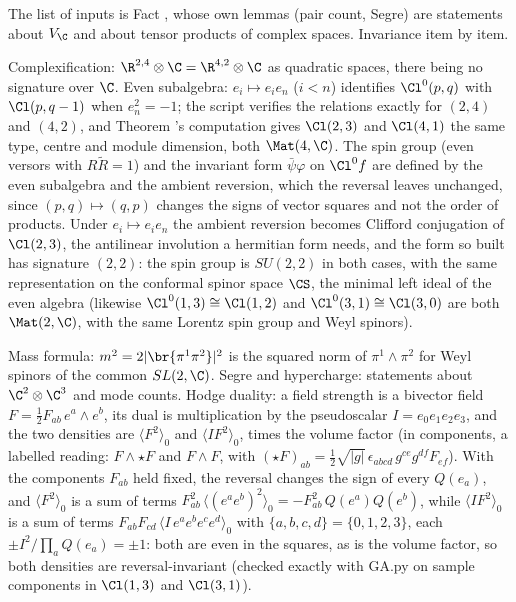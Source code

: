 The list of inputs is Fact , whose own lemmas (pair count, Segre) are statements about $V_{\C}$ and about tensor products of complex spaces. Invariance item by item.

Complexification: $\R^{2,4} \otimes \C = \R^{4,2} \otimes \C$ as quadratic spaces, there being no signature over $\C$. Even subalgebra: $e_{i} \mapsto e_{i}e_{n}$ ($i < n$) identifies $\Cl^{0}(p,q)$ with $\Cl(p, q-1)$ when $e_{n}^{2} = -1$; the script verifies the relations exactly for $(2,4)$ and $(4,2)$, and Theorem 's computation gives $\Cl(2,3)$ and $\Cl(4,1)$ the same type, centre and module dimension, both $\Mat(4,\C)$. The spin group (even versors with $R\tilde{R} = 1$) and the invariant form $\bar{\psi}\varphi$ on $\Cl^{0}f$ are defined by the even subalgebra and the ambient reversion, which the reversal leaves unchanged, since $(p,q) \mapsto (q,p)$ changes the signs of vector squares and not the order of products. Under $e_{i} \mapsto e_{i}e_{n}$ the ambient reversion becomes Clifford conjugation of $\Cl(2,3)$, the antilinear involution a hermitian form needs, and the form so built has signature $(2,2)$: the spin group is $SU(2,2)$ in both cases, with the same representation on the conformal spinor space $\CS$, the minimal left ideal of the even algebra (likewise $\Cl^{0}(1,3) \cong \Cl(1,2)$ and $\Cl^{0}(3,1) \cong \Cl(3,0)$ are both $\Mat(2,\C)$, with the same Lorentz spin group and Weyl spinors).

Mass formula: $m^{2} = 2|\br{\pi^{1}\pi^{2}}|^{2}$ is the squared norm of $\pi^{1} \wedge \pi^{2}$ for Weyl spinors of the common $SL(2,\C)$. Segre and hypercharge: statements about $\C^{2} \otimes \C^{3}$ and mode counts. Hodge duality: a field strength is a bivector field $F = \tfrac12 F_{ab}\,e^{a}\wedge e^{b}$, its dual is multiplication by the pseudoscalar $I = e_{0}e_{1}e_{2}e_{3}$, and the two densities are $\langle F^{2}\rangle_{0}$ and $\langle IF^{2}\rangle_{0}$, times the volume factor (in components, a labelled reading: $F \wedge \star F$ and $F \wedge F$, with $(\star F)_{ab} = \tfrac{1}{2}\sqrt{|g|}\,\epsilon_{abcd}\,g^{ce}g^{df}F_{ef}$). With the components $F_{ab}$ held fixed, the reversal changes the sign of every $Q(e_{a})$, and $\langle F^{2}\rangle_{0}$ is a sum of terms $F_{ab}^{2}\,\langle(e^{a}e^{b})^{2}\rangle_{0} = -F_{ab}^{2}\,Q(e^{a})Q(e^{b})$, while $\langle IF^{2}\rangle_{0}$ is a sum of terms $F_{ab}F_{cd}\,\langle I\,e^{a}e^{b}e^{c}e^{d}\rangle_{0}$ with $\{a,b,c,d\} = \{0,1,2,3\}$, each $\pm I^{2}/\prod_{a}Q(e_{a}) = \pm 1$: both are even in the squares, as is the volume factor, so both densities are reversal-invariant (checked exactly with GA.py on sample components in $\Cl(1,3)$ and $\Cl(3,1)$).

